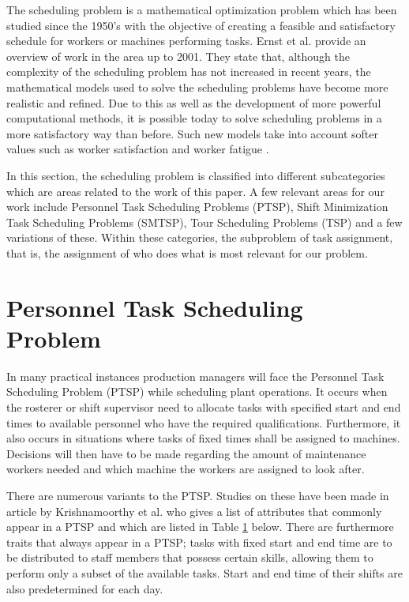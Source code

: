 
The scheduling problem is a mathematical optimization problem which has been studied since the 1950's with the objective of creating a feasible and satisfactory schedule for workers or machines performing tasks. Ernst et al. provide an overview of work in the area up to 2001. They state that, although the complexity of the scheduling problem has not increased in recent years, the mathematical models used to solve the scheduling problems have become more realistic and refined. Due to this as well as the development of more powerful computational methods, it is possible today to solve scheduling problems in a more satisfactory way than before. Such new models take into account softer values such as worker satisfaction and worker fatigue \citet{ernst_2004}.

In this section, the scheduling problem is classified into different subcategories which are areas related to the work of this paper. A few relevant areas for our work include Personnel Task Scheduling Problems (PTSP), Shift Minimization Task Scheduling Problems (SMTSP), Tour Scheduling Problems (TSP) and a few variations of these. Within these categories, the subproblem of task assignment, that is, the assignment of who does what is most relevant for our problem.



\section{Personnel Task Scheduling Problem} \label{PTSP}

In many practical instances production managers will face the Personnel Task Scheduling Problem (PTSP) while scheduling plant operations. It occurs when the rosterer or shift supervisor need to allocate tasks with specified start and end times to available personnel who have the required qualifications. Furthermore, it also occurs in situations where tasks of fixed times shall be assigned to machines. Decisions will then have to be made regarding the amount of maintenance workers needed and which machine the workers are assigned to look after. \citet{krishnamoorthy_2001}

There are numerous variants to the PTSP. Studies on these have been made in article \citet{krishnamoorthy_2001} by Krishnamoorthy et al. who gives a list of attributes that commonly appear in a PTSP and which are listed in Table \ref{PTSP} below. There are furthermore traits that always appear in a PTSP; tasks with fixed start and end time are to be distributed to staff members that possess certain skills, allowing them to perform only a subset of the available tasks. Start and end time of their shifts are also predetermined for each day.

